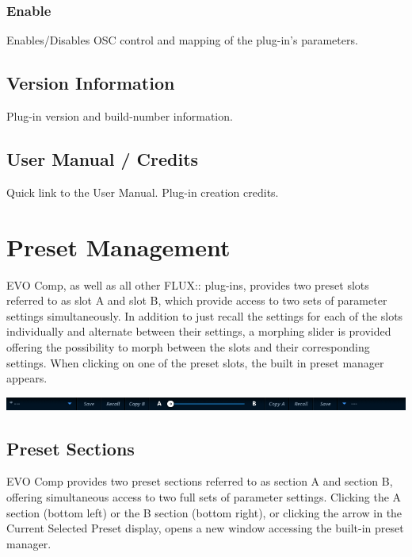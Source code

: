 \documentclass[
  letterpaper,
  DIV=11,
  numbers=noendperiod]{scrreport}
\begin{document}
\hypertarget{enable}{%
\subsection{Enable}\label{enable}}

Enables/Disables OSC control and mapping of the plug-in's parameters.

\hypertarget{version-information}{%
\section{Version Information}\label{version-information}}

Plug-in version and build-number information.

\hypertarget{user-manual-credits}{%
\section{User Manual / Credits}\label{user-manual-credits}}

Quick link to the User Manual. Plug-in creation credits.


\hypertarget{preset-management}{%
\chapter{Preset Management}\label{preset-management}}

EVO Comp, as well as all other FLUX:: plug-ins, provides two preset
slots referred to as slot A and slot B, which provide access to two sets
of parameter settings simultaneously. In addition to just recall the
settings for each of the slots individually and alternate between their
settings, a morphing slider is provided offering the possibility to
morph between the slots and their corresponding settings. When clicking
on one of the preset slots, the built in preset manager appears.

\includegraphics{./include/ManualEvoChannel-013.png}

\hypertarget{preset-sections}{%
\section{Preset Sections}\label{preset-sections}}

EVO Comp provides two preset sections referred to as section A and
section B, offering simultaneous access to two full sets of parameter
settings. Clicking the A section (bottom left) or the B section (bottom
right), or clicking the arrow in the Current Selected Preset display,
opens a new window accessing the built-in preset manager.
\end{document}
